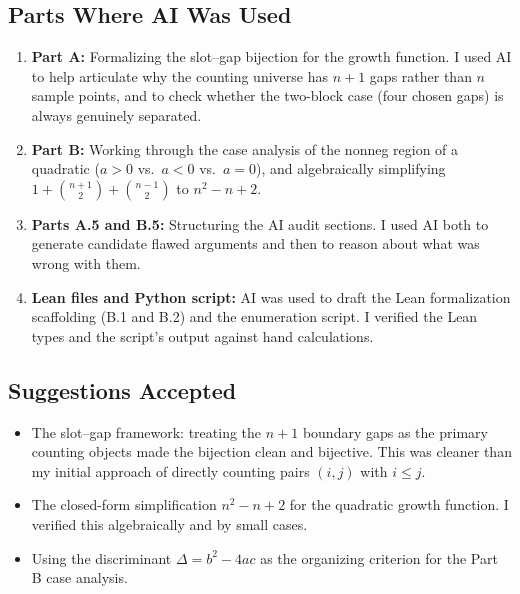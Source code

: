 \documentclass{article}
\begin{document}
\subsection{Parts Where AI Was Used}
 
\begin{enumerate}
  \item \textbf{Part A:} Formalizing the slot--gap bijection for the growth
    function.  I used AI to help articulate why the counting universe has
    $n+1$ gaps rather than $n$ sample points, and to check whether the
    two-block case (four chosen gaps) is always genuinely separated.
 
  \item \textbf{Part B:} Working through the case analysis of the nonneg
    region of a quadratic ($a>0$ vs.\ $a<0$ vs.\ $a=0$), and algebraically
    simplifying $1+\binom{n+1}{2}+\binom{n-1}{2}$ to $n^2-n+2$.
 
  \item \textbf{Parts A.5 and B.5:} Structuring the AI audit sections.
    I used AI both to generate candidate flawed arguments and then to reason
    about what was wrong with them.
 
  \item \textbf{Lean files and Python script:} AI was used to draft the Lean
    formalization scaffolding (B.1 and B.2) and the enumeration script.
    I verified the Lean types and the script's output against hand calculations.
\end{enumerate}
 
\subsection{Suggestions Accepted}
 
\begin{itemize}
  \item The slot--gap framework: treating the $n+1$ boundary gaps as the
    primary counting objects made the bijection clean and bijective.
    This was cleaner than my initial approach of directly counting pairs
    $(i,j)$ with $i\le j$.
 
  \item The closed-form simplification $n^2-n+2$ for the quadratic growth
    function.  I verified this algebraically and by small cases.
 
  \item Using the discriminant $\Delta=b^2-4ac$ as the organizing criterion
    for the Part B case analysis.
\end{itemize}
 
\end{document}
